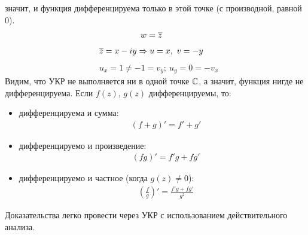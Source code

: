 значит, и функция дифференцируема только в этой точке (с производной, равной
$0$).
\Example
\begin{align*}
  & w = \overline{z}
\end{align*}
\begin{align*}
  & \overline{z} = x - iy \Rightarrow u = x, \ v = -y
\end{align*}
\begin{align*}
  & u_x = 1 \neq -1 = v_y; \ u_y = 0 = - v_x
\end{align*}
Видим, что УКР не выполняется ни в одной точке $\mathbb{C}$, а значит, функция нигде не
дифференцируема.
\prop
Если $f(z)$, $g(z)$ дифференцируемы, то:
\begin{itemize}
    \item дифференцируема и сумма:
    \begin{align*}
      & \left( f+g \right)' = f'+g'
    \end{align*}
    \item дифференцируемо и произведение:
    \begin{align*}
      & \left( fg \right)' = f'g+fg'
    \end{align*}
    \item дифференцируемо и частное (когда $g(z) \neq 0$):
    \begin{align*}
      & \left( \frac{f}{g} \right)' = \frac{f'g+fg'}{g^2}
    \end{align*}
\end{itemize}
\pr
Доказательства легко провести через УКР с использованием действительного
анализа.
